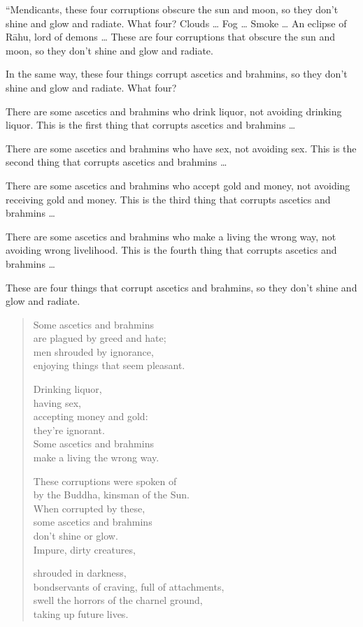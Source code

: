 \documentclass[12pt,openany]{book}%
\begin{document}
“Mendicants, these four corruptions obscure the sun and moon, so they don’t shine and glow and radiate. What four? Clouds … Fog … Smoke … An eclipse of \textsanskrit{Rāhu}, lord of demons … These are four corruptions that obscure the sun and moon, so they don’t shine and glow and radiate. 

In the same way, these four things corrupt ascetics and brahmins, so they don’t shine and glow and radiate. What four? 

There are some ascetics and brahmins who drink liquor, not avoiding drinking liquor. This is the first thing that corrupts ascetics and brahmins … 

There are some ascetics and brahmins who have sex, not avoiding sex. This is the second thing that corrupts ascetics and brahmins … 

There are some ascetics and brahmins who accept gold and money, not avoiding receiving gold and money. This is the third thing that corrupts ascetics and brahmins … 

There are some ascetics and brahmins who make a living the wrong way, not avoiding wrong livelihood. This is the fourth thing that corrupts ascetics and brahmins … 

These are four things that corrupt ascetics and brahmins, so they don’t shine and glow and radiate. 

\begin{verse}%
Some ascetics and brahmins \\
are plagued by greed and hate; \\
men shrouded by ignorance, \\
enjoying things that seem pleasant. 

Drinking liquor, \\
having sex, \\
accepting money and gold: \\
they’re ignorant. \\
Some ascetics and brahmins \\
make a living the wrong way. 

These corruptions were spoken of \\
by the Buddha, kinsman of the Sun. \\
When corrupted by these, \\
some ascetics and brahmins \\
don’t shine or glow. \\
Impure, dirty creatures, 

shrouded in darkness, \\
bondservants of craving, full of attachments, \\
swell the horrors of the charnel ground, \\
taking up future lives. 

%
\end{verse}
\end{document}
